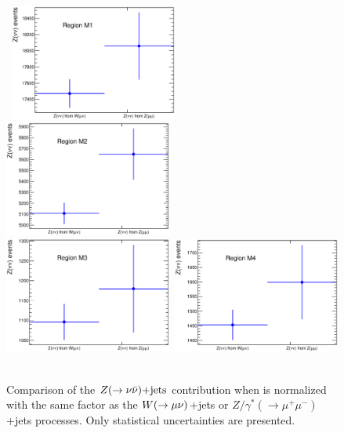\begin{figure}
\begin{center}
\mbox{
  \includegraphics[width=0.49\textwidth]{Appendix_ClosureTestZnunu/Figures/CRwmn_vs_CRzmm_ZnunuEvents_A6.eps}
  \includegraphics[width=0.49\textwidth]{Appendix_ClosureTestZnunu/Figures/CRwmn_vs_CRzmm_ZnunuEvents_A3.eps}
}                                                                         
\mbox{                                                                    
  \includegraphics[width=0.49\textwidth]{Appendix_ClosureTestZnunu/Figures/CRwmn_vs_CRzmm_ZnunuEvents_A4.eps}
  \includegraphics[width=0.49\textwidth]{Appendix_ClosureTestZnunu/Figures/CRwmn_vs_CRzmm_ZnunuEvents_A8.eps}
}
\end{center}
\caption{
Comparison of the $Z(\rightarrow \nu \bar{\nu})\text{+jets}$ contribution when is normalized with the same factor as the $W(\rightarrow \mu \nu)$+jets or $Z/\gamma^{\ast}(\rightarrow \mu^{+}\mu^{-})$+jets processes. Only statistical uncertainties are presented.
}
\label{fig:closey}
\end{figure}


